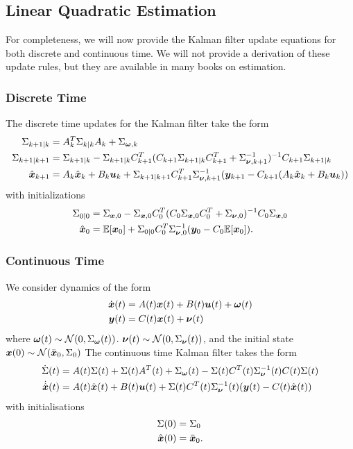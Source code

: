 \subsection{Linear Quadratic Estimation}


For completeness, we will now provide the Kalman filter update equations for both discrete and continuous time. We will not provide a derivation of these update rules, but they are available in many books on estimation.

\subsubsection{Discrete Time}

The discrete time updates for the Kalman filter take the form
\begin{align}
    \Sigma_{k+1|k} &= A^T_k \Sigma_{k|k} A_k + \Sigma_{\bm{\omega},k} \\ 
    \Sigma_{k+1|k+1} &= \Sigma_{k+1|k} - \Sigma_{k+1|k} C^T_{k+1} (C_{k+1} \Sigma_{k+1|k} C^T_{k+1} + \Sigma^{-1}_{\bm{\nu},k+1})^{-1} C_{k+1} \Sigma_{k+1|k} \\
    \hat{\bm{x}}_{k+1} &= A_k \hat{\bm{x}}_k + B_k \bm{u}_k + \Sigma_{k+1|k+1} C^T_{k+1} \Sigma^{-1}_{\bm{\nu},k+1} (\bm{y}_{k+1} - C_{k+1} (A_k \hat{\bm{x}}_k + B_k \bm{u}_k))
\end{align}
with initializations
\begin{align}
    \Sigma_{0|0} &= \Sigma_{\bm{x},0} -  \Sigma_{\bm{x},0} C^T_0 ( C_0 \Sigma_{\bm{x},0} C^T_0 + \Sigma_{\bm{\nu},0})^{-1} C_0  \Sigma_{\bm{x},0}\\
    \hat{\bm{x}}_0 &= \mathbb{E}[\bm{x}_0] + \Sigma_{0|0} C_0^T \Sigma_{\bm{\nu}, 0}^{-1} (\bm{y}_0 - C_0 \mathbb{E}[\bm{x}_0]).
\end{align}

\subsubsection{Continuous Time}

We consider dynamics of the form
\begin{align}
    \dot{\bm{x}}(t) &= A(t) \bm{x}(t) + B(t) \bm{u}(t) + \bm{\omega}(t)\\
    \bm{y}(t) &= C(t) \bm{x}(t) + \bm{\nu}(t)
\end{align}
where $\bm{\omega}(t) \sim \mathcal{N}(0, \Sigma_{\bm{\omega}}(t))$. $\bm{\nu}(t) \sim \mathcal{N}(0, \Sigma_{\bm{\nu}}(t))$, and the initial state $\bm{x}(0) \sim \mathcal{N}(\bar{\bm{x}}_0, \Sigma_0)$ The continuous time Kalman filter takes the form
\begin{align}
\dot{\Sigma}(t) &=  A(t) \Sigma(t) + \Sigma(t) A^T(t) + \Sigma_{\bm{\omega}}(t) - \Sigma(t) C^T(t) \Sigma_{\bm{\nu}}^{-1}(t) C(t) \Sigma(t)\\
    \dot{\hat{\bm{x}}}(t) &= A(t) \hat{\bm{x}}(t) + B(t) \bm{u}(t) + \Sigma(t) C^T(t) \Sigma_{\bm{\nu}}^{-1}(t) (\bm{y}(t) - C(t) \hat{\bm{x}}(t))
\end{align}
with initialisations
\begin{align}
    \Sigma(0) &= \Sigma_0\\
    \hat{\bm{x}}(0) &= \bar{\bm{x}}_0.
\end{align}

